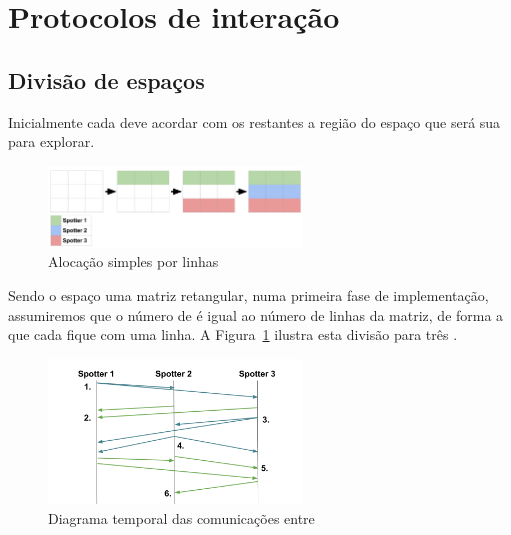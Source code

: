 \documentclass[12pt]{report}
\begin{document}
\section{Protocolos de interação}


\subsection{Divisão de espaços}
Inicialmente cada \spotter deve acordar com os restantes a região do espaço que será sua para explorar. 

\begin{figure}[h]
	\centering
	\includegraphics[width=0.6\textwidth]{spotter-spaces}
	\caption{Alocação simples por linhas}
	\label{spotter-spaces}
\end{figure}

Sendo o espaço uma matriz retangular, numa primeira fase de implementação, assumiremos que o número de \spotters é igual ao número de linhas da matriz, de forma a que cada \spotter fique com uma linha. A Figura~\ref{spotter-spaces} ilustra esta divisão para três \spotters.

\begin{figure}[h]
	\centering
    \includegraphics[width=0.6\textwidth]{spotter-agreement}
	\caption{Diagrama temporal das comunicações entre \spotters}
	\label{spotter-agreement}
\end{figure}  
\end{document}
